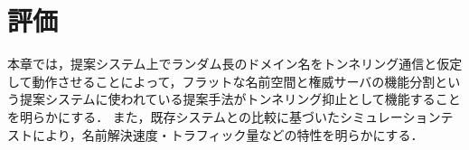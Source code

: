 \section{評価}
\label{sec:evaluation}
%
%
本章では，提案システム上でランダム長のドメイン名をトンネリング通信と仮定して動作させることによって，フラットな名前空間と権威サーバの機能分割という提案システムに使われている提案手法がトンネリング抑止として機能することを明らかにする．
また，既存システムとの比較に基づいたシミュレーションテストにより，名前解決速度・トラフィック量などの特性を明らかにする．

